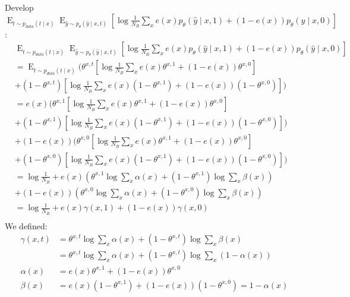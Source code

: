 \documentclass[oneside,12pt]{article}
\begin{document}
%
\\\\
Develop $\operatorname{E}_{t \sim p_{data}(t \mid x)}
        \operatorname{E}_{\hat{y} \sim p_\theta(\hat{y} \mid x,t)}
        \left[\operatorname{log}\frac{1}{N_B}\sum_x e(x)p_\theta(\hat{y} \mid x,1) + (1-e(x))p_\theta(\hat{y} \mid x,0)\right]$:
\begin{equation}
    \begin{split}
        &\operatorname{E}_{t \sim p_{data}(t \mid x)}
        \operatorname{E}_{\hat{y} \sim p_\theta(\hat{y} \mid x,t)}
        \left[\operatorname{log}\frac{1}{N_B}\sum_x e(x)p_\theta(\hat{y} \mid x,1) + (1-e(x))p_\theta(\hat{y} \mid x,0)\right]\\
        &= \operatorname{E}_{t \sim p_{data}(t \mid x)}
        (\theta^{x,t}\left[\operatorname{log}\frac{1}{N_B}\sum_x e(x)\theta^{x,1} + (1-e(x))\theta^{x,0}\right]\\
        &+ (1-\theta^{x,t})\left[\operatorname{log}\frac{1}{N_B}\sum_x e(x)(1-\theta^{x,1}) + (1-e(x))(1-\theta^{x,0})\right])\\
        &= e(x)
        (\theta^{x,1}\left[\operatorname{log}\frac{1}{N_B}\sum_x e(x)\theta^{x,1} + (1-e(x))\theta^{x,0}\right]\\
        &+ (1-\theta^{x,1})\left[\operatorname{log}\frac{1}{N_B}\sum_x e(x)(1-\theta^{x,1}) + (1-e(x))(1-\theta^{x,0})\right])\\
        &+ (1-e(x))(\theta^{x,0}\left[\operatorname{log}\frac{1}{N_B}\sum_x e(x)\theta^{x,1} + (1-e(x))\theta^{x,0}\right]\\
        &+ (1-\theta^{x,0})\left[\operatorname{log}\frac{1}{N_B}\sum_x e(x)(1-\theta^{x,1}) + (1-e(x))(1-\theta^{x,0})\right])\\
        &= \operatorname{log}\frac{1}{N_B} + e(x)
        \left(\theta^{x,1}\operatorname{log}\sum_x \alpha(x)
        + (1-\theta^{x,1})\operatorname{log}\sum_x \beta(x)\right)\\
        &+ (1-e(x))\left(\theta^{x,0}\operatorname{log}\sum_x \alpha(x)
        + (1-\theta^{x,0})\operatorname{log}\sum_x \beta(x)\right)\\
        &= \operatorname{log}\frac{1}{N_B} + e(x)
        \gamma(x,1) + (1-e(x))\gamma(x,0)\\
    \end{split}
\end{equation}
%
We defined:
\begin{equation}
    \begin{split}
        \gamma(x,t) &= \theta^{x,t}\operatorname{log}\sum_x \alpha(x)
        + (1-\theta^{x,t})\operatorname{log}\sum_x \beta(x)\\
        &= \theta^{x,t}\operatorname{log}\sum_x \alpha(x)
        + (1-\theta^{x,t})\operatorname{log}\sum_x (1 - \alpha(x))\\
        \alpha(x) &= e(x)\theta^{x,1} + (1-e(x))\theta^{x,0}\\
        \beta(x) &= e(x)(1-\theta^{x,1}) + (1-e(x))(1-\theta^{x,0}) = 1 - \alpha(x)
    \end{split}
\end{equation}
\end{document}
